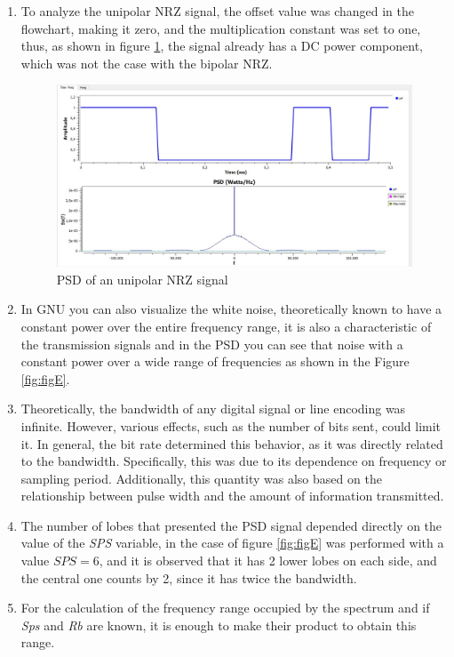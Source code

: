 \documentclass{journal}[IEEEtran, twocolumn]             %
\begin{document}
\begin{multicols}{2}
\begin{enumerate}
    \item To analyze the unipolar NRZ signal, the offset value was changed in the flowchart, making it zero, and the multiplication constant was set to one, thus, as shown in figure \ref{fig:unipolar_PSD}, the signal already has a DC power component, which was not the case with the bipolar NRZ.\begin{figure}[H]
    \centering
        \centering
        \includegraphics[width=0.6\columnwidth]{figs/psd_unipolar.jpeg}
    \caption{PSD of an unipolar NRZ signal}
    \label{fig:unipolar_PSD}
    \end{figure}

    \item In GNU you can also visualize the white noise, theoretically known to have a constant power over the entire frequency range, it is also a characteristic of the transmission signals and in the PSD you can see that noise with a constant power over a wide range of frequencies as shown in the Figure \ref{fig:figE}.

    \item Theoretically, the bandwidth of any digital signal or line encoding was infinite. However, various effects, such as the number of bits sent, could limit it. In general, the bit rate determined this behavior, as it was directly related to the bandwidth. Specifically, this was due to its dependence on frequency or sampling period. Additionally, this quantity was also based on the relationship between pulse width and the amount of information transmitted.

    \item The number of lobes that presented the PSD signal depended directly on the value of the \textit{SPS} variable, in the case of figure \ref{fig:figE} was performed with a value $SPS=6$, and it is observed that it has 2 lower lobes on each side, and the central one counts by 2, since it has twice the bandwidth.

    \item For the calculation of the frequency range occupied by the spectrum and if \textit{Sps} and \textit{Rb} are known, it is enough to make their product to obtain this range.


\end{enumerate}
\end{multicols}
\end{document}
